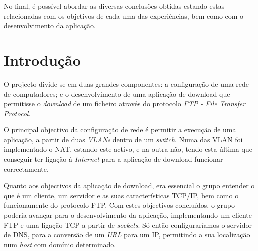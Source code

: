 \documentclass[a4paper, 11pt]{article}
\begin{document}
No final, é possível abordar as diversas conclusões obtidas estando estas relacionadas com os objetivos de cada uma das experiências, bem como com o desenvolvimento da aplicação.

\section{Introdução}

O projecto divide-se em duas grandes componentes: a configuração de uma rede de computadores; e o desenvolvimento de uma aplicação de download que permitisse o \textit{download} de um ficheiro através do protocolo \textit{FTP - File Transfer Protocol}.

O principal objectivo da configuração de rede é permitir a execução de uma aplicação, a partir de duas \textit{VLANs} dentro de um \textit{switch}. Numa das VLAN foi implementado o NAT, estando este activo, e na outra não, tendo esta última que conseguir ter ligação à \textit{Internet} para a aplicação de download funcionar correctamente.

Quanto aos objectivos da aplicação de download, era essencial o grupo entender o que é um cliente, um servidor e as suas características TCP/IP, bem como o funcionamente do protocolo FTP. Com estes objectivos concluídos, o grupo poderia avançar para o desenvolvimento da aplicação, implementando um cliente FTP e uma ligação TCP a partir de \textit{sockets}. Só então configuraríamos o servidor de DNS, para a conversão de um \textit{URL} para um IP, permitindo a sua localização num \textit{host} com domínio determinado.\\

\end{document}
